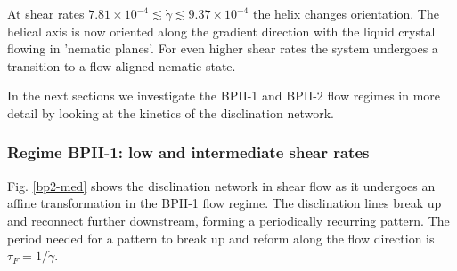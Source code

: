 \documentclass[aps,pre,reprint,superscriptaddress, twocolumn]{revtex4}
\newcommand{\e}[1]{\times10^{#1}}
\newcommand{\gd}{\dot{\gamma}}
\begin{document}
At shear rates $7.81\e{-4}\lesssim\gd \lesssim 9.37\e{-4}$ the helix changes orientation.
The helical axis is now oriented along the gradient direction with
the liquid crystal flowing in 'nematic planes'. For even higher shear rates
the system undergoes a transition to a flow-aligned nematic state.

In the next sections we investigate the BPII-1 and BPII-2 flow regimes in more detail 
by looking at the kinetics of the disclination network.

\subsubsection{Regime BPII-1: low and intermediate shear rates}

Fig. \ref{bp2-med} shows the disclination network in shear flow as
it undergoes an affine transformation in the BPII-1 flow regime. 
The disclination lines break up and 
reconnect further downstream, forming a periodically recurring pattern. The
period needed for a pattern to break up and 
reform along the flow direction is $\tau_F=1/\gd$.
\end{document}

